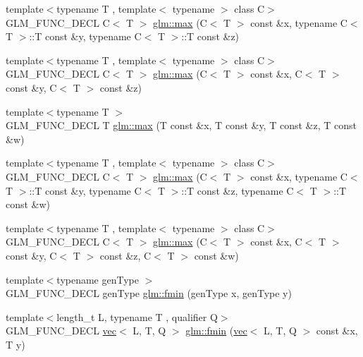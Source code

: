 \begin{DoxyCompactItemize}
\item 
{\footnotesize template$<$typename T , template$<$ typename $>$ class C$>$ }\\G\+L\+M\+\_\+\+F\+U\+N\+C\+\_\+\+D\+E\+CL C$<$ T $>$ \hyperlink{group__gtx__extended__min__max_gae1b7bbe5c91de4924835ea3e14530744}{glm\+::max} (C$<$ T $>$ const \&x, typename C$<$ T $>$\+::T const \&y, typename C$<$ T $>$\+::T const \&z)
\item 
{\footnotesize template$<$typename T , template$<$ typename $>$ class C$>$ }\\G\+L\+M\+\_\+\+F\+U\+N\+C\+\_\+\+D\+E\+CL C$<$ T $>$ \hyperlink{group__gtx__extended__min__max_gaf832e9d4ab4826b2dda2fda25935a3a4}{glm\+::max} (C$<$ T $>$ const \&x, C$<$ T $>$ const \&y, C$<$ T $>$ const \&z)
\item 
{\footnotesize template$<$typename T $>$ }\\G\+L\+M\+\_\+\+F\+U\+N\+C\+\_\+\+D\+E\+CL T \hyperlink{group__gtx__extended__min__max_ga78e04a0cef1c4863fcae1a2130500d87}{glm\+::max} (T const \&x, T const \&y, T const \&z, T const \&w)
\item 
{\footnotesize template$<$typename T , template$<$ typename $>$ class C$>$ }\\G\+L\+M\+\_\+\+F\+U\+N\+C\+\_\+\+D\+E\+CL C$<$ T $>$ \hyperlink{group__gtx__extended__min__max_ga7cca8b53cfda402040494cdf40fbdf4a}{glm\+::max} (C$<$ T $>$ const \&x, typename C$<$ T $>$\+::T const \&y, typename C$<$ T $>$\+::T const \&z, typename C$<$ T $>$\+::T const \&w)
\item 
{\footnotesize template$<$typename T , template$<$ typename $>$ class C$>$ }\\G\+L\+M\+\_\+\+F\+U\+N\+C\+\_\+\+D\+E\+CL C$<$ T $>$ \hyperlink{group__gtx__extended__min__max_gaacffbc466c2d08c140b181e7fd8a4858}{glm\+::max} (C$<$ T $>$ const \&x, C$<$ T $>$ const \&y, C$<$ T $>$ const \&z, C$<$ T $>$ const \&w)
\item 
{\footnotesize template$<$typename gen\+Type $>$ }\\G\+L\+M\+\_\+\+F\+U\+N\+C\+\_\+\+D\+E\+CL gen\+Type \hyperlink{group__gtx__extended__min__max_gaa3200559611ac5b9b9ae7283547916a7}{glm\+::fmin} (gen\+Type x, gen\+Type y)
\item 
{\footnotesize template$<$length\+\_\+t L, typename T , qualifier Q$>$ }\\G\+L\+M\+\_\+\+F\+U\+N\+C\+\_\+\+D\+E\+CL \hyperlink{structglm_1_1vec}{vec}$<$ L, T, Q $>$ \hyperlink{group__gtx__extended__min__max_gae989203363cff9eab5093630df4fe071}{glm\+::fmin} (\hyperlink{structglm_1_1vec}{vec}$<$ L, T, Q $>$ const \&x, T y)

\end{DoxyCompactItemize}
